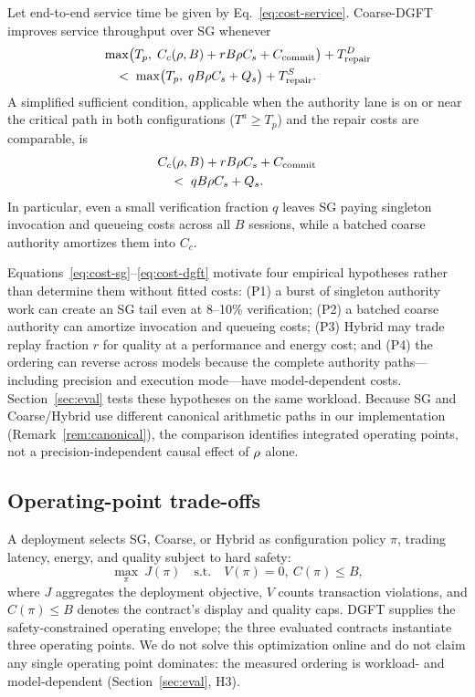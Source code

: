 \begin{proposition}\label{prop:coarse}
Let end-to-end service time be given by
Eq.~\eqref{eq:cost-service}. Coarse-DGFT improves service throughput over
SG whenever
\[
\begin{split}
  &\max\bigl(T_p,\; C_c(\rho,B) + rB\rho C_s +
  C_{\mathrm{commit}}\bigr) + T_{\mathrm{repair}}^{D} \\
  &\quad <\; \max\bigl(T_p,\; qB\rho C_s + Q_s\bigr)
  + T_{\mathrm{repair}}^{S}.
\end{split}
\]
A simplified sufficient condition, applicable when the authority lane is on
or near the critical path in both configurations ($T^{a} \ge T_p$) and the
repair costs are comparable, is
\[
\begin{split}
  &C_c(\rho,B) + rB\rho C_s + C_{\mathrm{commit}} \\
  &\quad <\; qB\rho C_s + Q_s .
\end{split}
\]
In particular, even a small verification fraction $q$ leaves SG paying
singleton invocation and queueing costs across all $B$ sessions, while a
batched coarse authority amortizes them into $C_c$.
\end{proposition}

Equations~\eqref{eq:cost-sg}--\eqref{eq:cost-dgft} motivate four empirical
hypotheses rather than determine them without fitted costs: (P1) a burst of
singleton authority work can create an SG tail even at 8--10\% verification;
(P2) a batched coarse authority can amortize invocation and queueing costs;
(P3) Hybrid may trade replay fraction $r$ for quality at a performance and
energy cost; and (P4) the ordering can reverse across models because the
complete authority paths---including precision and execution mode---have
model-dependent costs. Section~\ref{sec:eval} tests these hypotheses on the
same workload. Because SG and Coarse/Hybrid use different canonical
arithmetic paths in our implementation (Remark~\ref{rem:canonical}), the
comparison identifies integrated operating points, not a precision-independent
causal effect of $\rho$ alone.

\subsection{Operating-point trade-offs}\label{sec:dgft:tradeoff}

A deployment selects SG, Coarse, or Hybrid as configuration policy $\pi$,
trading latency, energy, and quality subject to hard safety:
\[
  \max_{\pi}\ J(\pi)
  \quad\text{s.t.}\quad V(\pi)=0,\ C(\pi)\leq B,
\]
where $J$ aggregates the deployment objective, $V$ counts transaction
violations, and $C(\pi)\leq B$ denotes the contract's display and quality
caps.
DGFT supplies the safety-constrained operating envelope; the three evaluated
contracts instantiate three operating points. We do not solve this
optimization online and do not claim any single operating point dominates:
the measured ordering is workload- and model-dependent
(Section~\ref{sec:eval}, H3).
